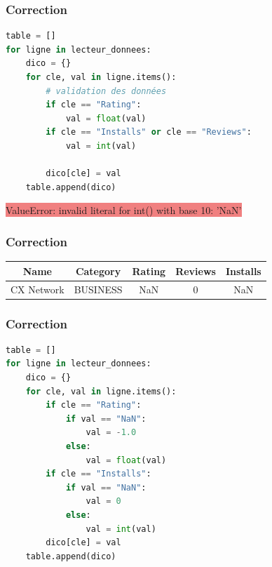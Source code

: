 \documentclass[svgnames,11pt]{beamer}
\begin{document}
\begin{frame}[fragile]
    \frametitle{Correction}

    \begin{center}
        \begin{lstlisting}[language=Python, basicstyle=\small, xleftmargin=1em, xrightmargin=1em]
table = []
for ligne in lecteur_donnees:
    dico = {}
    for cle, val in ligne.items():
        # validation des données
        if cle == "Rating":
            val = float(val)
        if cle == "Installs" or cle == "Reviews":
            val = int(val)

        dico[cle] = val
    table.append(dico)
\end{lstlisting}
        \label{CODE}
    \end{center}

    \colorbox{LightCoral}{ValueError: invalid literal for int() with base 10: 'NaN'
    }
\end{frame}
\begin{frame}
    \frametitle{Correction}

    \begin{center}
        \begin{tabular}{|*{5}{c|}}
            \hline
            Name       & Category & Rating & Reviews & Installs \\
            \hline
            CX Network & BUSINESS & NaN    & 0       & NaN      \\
            \hline
        \end{tabular}
    \end{center}
\end{frame}
\begin{frame}[fragile]
    \frametitle{Correction}
    \begin{center}
        \begin{lstlisting}[language=Python, basicstyle=\small, xleftmargin=1em, xrightmargin=1em]
table = []
for ligne in lecteur_donnees:
    dico = {}
    for cle, val in ligne.items():
        if cle == "Rating":
            if val == "NaN":
                val = -1.0
            else:
                val = float(val)
        if cle == "Installs":
            if val == "NaN":
                val = 0
            else:
                val = int(val)
        dico[cle] = val
    table.append(dico)
\end{lstlisting}
        \label{CODE}
    \end{center}
\end{frame}
\end{document}
